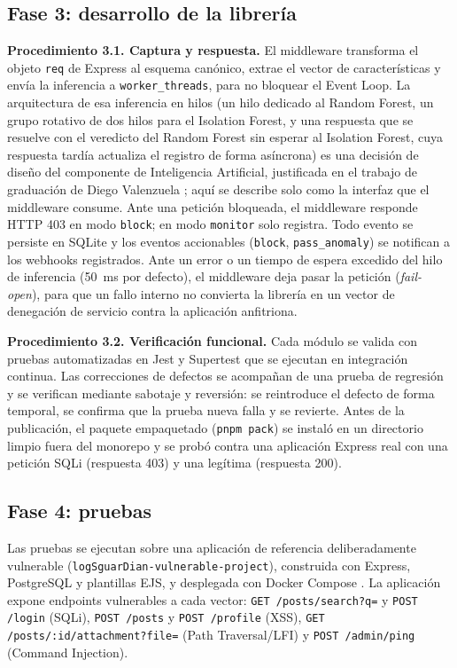 \subsection{Fase 3: desarrollo de la librería}
\label{subsec:met-f3}

\textbf{Procedimiento 3.1. Captura y respuesta.} El middleware transforma el objeto
\texttt{req} de Express al esquema canónico, extrae el vector de características y envía la
inferencia a \texttt{worker\_threads}, para no bloquear el Event Loop. La arquitectura de esa
inferencia en hilos (un hilo dedicado al Random Forest, un grupo rotativo de dos hilos para el
Isolation Forest, y una respuesta que se resuelve con el veredicto del Random Forest sin esperar
al Isolation Forest, cuya respuesta tardía actualiza el registro de forma asíncrona) es una
decisión de diseño del componente de Inteligencia Artificial, justificada en el trabajo de
graduación de Diego Valenzuela \cite{valenzuela2026ia}; aquí se describe solo como la interfaz que el middleware consume.
Ante una petición bloqueada, el middleware responde HTTP 403 en
modo \texttt{block}; en modo \texttt{monitor} solo registra. Todo evento se persiste en SQLite y
los eventos accionables (\texttt{block}, \texttt{pass\_anomaly}) se notifican a los webhooks
registrados. Ante un error o un tiempo de espera excedido del hilo de inferencia (50~ms por
defecto), el middleware deja pasar la petición (\textit{fail-open}), para que un fallo interno
no convierta la librería en un vector de denegación de servicio contra la aplicación anfitriona.

\textbf{Procedimiento 3.2. Verificación funcional.} Cada módulo se valida con pruebas
automatizadas en Jest \cite{jestdocs} y Supertest \cite{supertestdocs} que se ejecutan en
integración continua. Las correcciones de defectos se acompañan de una prueba de regresión y se
verifican mediante sabotaje y reversión: se reintroduce el defecto de forma temporal, se
confirma que la prueba nueva falla y se revierte. Antes de la publicación, el paquete empaquetado
(\texttt{pnpm pack}) se instaló en un directorio limpio fuera del monorepo y se probó contra una
aplicación Express real con una petición SQLi (respuesta 403) y una legítima (respuesta 200).

\subsection{Fase 4: pruebas}
\label{subsec:met-f4}

Las pruebas se ejecutan sobre una aplicación de referencia deliberadamente vulnerable
(\texttt{logSguarDian-vulnerable-project}), construida con Express, PostgreSQL y plantillas EJS,
y desplegada con Docker Compose \cite{dockerdocs, moreau2023}. La aplicación expone endpoints
vulnerables a cada vector: \texttt{GET /posts/search?q=} y \texttt{POST /login} (SQLi),
\texttt{POST /posts} y \texttt{POST /profile} (XSS), \texttt{GET /posts/:id/attachment?file=}
(Path Traversal/LFI) y \texttt{POST /admin/ping} (Command Injection).

